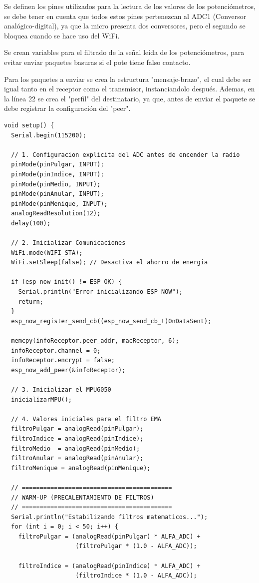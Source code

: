 \documentclass[10pt]{article}
\begin{document}
Se definen los pines utilizados para la lectura de los valores de los potenciómetros, se debe tener en cuenta que todos estos pines pertenezcan al ADC1 (Conversor analógico-digital), ya que la micro presenta dos conversores, pero el segundo se bloquea cuando se hace uso del WiFi.

Se crean variables para el filtrado de la señal leída de los potenciómetros, para evitar enviar paquetes basuras si el pote tiene falso contacto.

Para los paquetes a enviar se crea la estructura "mensaje-brazo", el cual debe ser igual tanto en el receptor como el transmisor, instanciandolo después. Ademas, en la línea 22 se crea el "perfil" del destinatario, ya que, antes de enviar el paquete se debe registrar la configuración del "peer".

\begin{lstlisting}
void setup() {
  Serial.begin(115200);

  // 1. Configuracion explicita del ADC antes de encender la radio
  pinMode(pinPulgar, INPUT);
  pinMode(pinIndice, INPUT);
  pinMode(pinMedio, INPUT);
  pinMode(pinAnular, INPUT);
  pinMode(pinMenique, INPUT);
  analogReadResolution(12);
  delay(100);

  // 2. Inicializar Comunicaciones
  WiFi.mode(WIFI_STA);
  WiFi.setSleep(false); // Desactiva el ahorro de energia

  if (esp_now_init() != ESP_OK) {
    Serial.println("Error inicializando ESP-NOW");
    return;
  }
  esp_now_register_send_cb((esp_now_send_cb_t)OnDataSent);
  
  memcpy(infoReceptor.peer_addr, macReceptor, 6);
  infoReceptor.channel = 0;  
  infoReceptor.encrypt = false;
  esp_now_add_peer(&infoReceptor);

  // 3. Inicializar el MPU6050
  inicializarMPU();

  // 4. Valores iniciales para el filtro EMA
  filtroPulgar = analogRead(pinPulgar);
  filtroIndice = analogRead(pinIndice);
  filtroMedio  = analogRead(pinMedio);
  filtroAnular = analogRead(pinAnular);
  filtroMenique = analogRead(pinMenique);

  // ==========================================
  // WARM-UP (PRECALENTAMIENTO DE FILTROS)
  // ==========================================
  Serial.println("Estabilizando filtros matematicos...");
  for (int i = 0; i < 50; i++) {
    filtroPulgar = (analogRead(pinPulgar) * ALFA_ADC) + 
                    (filtroPulgar * (1.0 - ALFA_ADC));
    
    filtroIndice = (analogRead(pinIndice) * ALFA_ADC) + 
                    (filtroIndice * (1.0 - ALFA_ADC));
    

\end{lstlisting}
\end{document}
